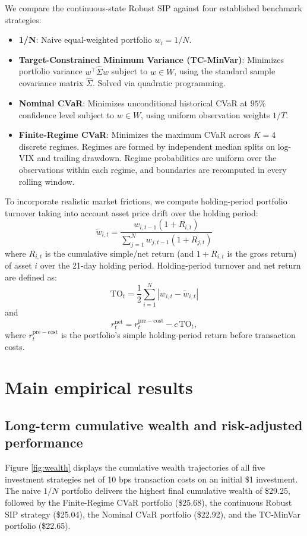 \documentclass[smallextended]{svjour3}
\begin{document}
We compare the continuous-state Robust SIP against four established benchmark strategies:
\begin{itemize}
    \item \textbf{1/N}: Naive equal-weighted portfolio $w_i = 1/N$.
    \item \textbf{Target-Constrained Minimum Variance (TC-MinVar)}: Minimizes portfolio variance $w^\top \widehat{\Sigma} w$ subject to $w \in W$, using the standard sample covariance matrix $\widehat{\Sigma}$. Solved via quadratic programming.
    \item \textbf{Nominal CVaR}: Minimizes unconditional historical CVaR at $95\%$ confidence level subject to $w \in W$, using uniform observation weights $1/T$.
    \item \textbf{Finite-Regime CVaR}: Minimizes the maximum CVaR across $K=4$ discrete regimes. Regimes are formed by independent median splits on log-VIX and trailing drawdown. Regime probabilities are uniform over the observations within each regime, and boundaries are recomputed in every rolling window.
\end{itemize}

To incorporate realistic market frictions, we compute holding-period portfolio turnover taking into account asset price drift over the holding period:
\begin{equation}
    \widetilde w_{i,t} = \frac{w_{i,t-1}(1+R_{i,t})}{\sum_{j=1}^N w_{j,t-1}(1+R_{j,t})}
\end{equation}
where $R_{i,t}$ is the cumulative simple/net return (and $1+R_{i,t}$ is the gross return) of asset $i$ over the 21-day holding period. Holding-period turnover and net return are defined as:
\begin{equation}
    \text{TO}_t = \frac{1}{2} \sum_{i=1}^N | w_{i,t} - \widetilde w_{i,t} |
\end{equation}
and
\begin{equation}
    r_t^{\mathrm{net}} = r_t^{\mathrm{pre-cost}} - c\,\mathrm{TO}_t,
\end{equation}
where $r_t^{\mathrm{pre-cost}}$ is the portfolio's simple holding-period return before transaction costs.

\section{Main empirical results}\label{sec:results}
\subsection{Long-term cumulative wealth and risk-adjusted performance}
Figure \ref{fig:wealth} displays the cumulative wealth trajectories of all five investment strategies net of 10 bps transaction costs on an initial \$1 investment. The naive $1/N$ portfolio delivers the highest final cumulative wealth of \$29.25, followed by the Finite-Regime CVaR portfolio (\$25.68), the continuous Robust SIP strategy (\$25.04), the Nominal CVaR portfolio (\$22.92), and the TC-MinVar portfolio (\$22.65).
\end{document}
